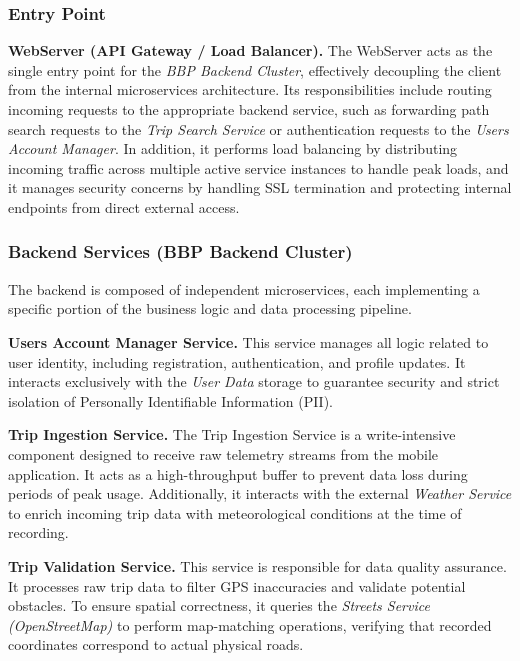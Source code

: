 \subsubsection{Entry Point}

\textbf{WebServer (API Gateway / Load Balancer).}
The WebServer acts as the single entry point for the \textit{BBP Backend Cluster}, effectively decoupling the client from the internal microservices architecture. Its responsibilities include routing incoming requests to the appropriate backend service, such as forwarding path search requests to the \textit{Trip Search Service} or authentication requests to the \textit{Users Account Manager}. In addition, it performs load balancing by distributing incoming traffic across multiple active service instances to handle peak loads, and it manages security concerns by handling SSL termination and protecting internal endpoints from direct external access.

\subsubsection{Backend Services (BBP Backend Cluster)}

The backend is composed of independent microservices, each implementing a specific portion of the business logic and data processing pipeline.

\textbf{Users Account Manager Service.}
This service manages all logic related to user identity, including registration, authentication, and profile updates. It interacts exclusively with the \textit{User Data} storage to guarantee security and strict isolation of Personally Identifiable Information (PII).

\textbf{Trip Ingestion Service.}
The Trip Ingestion Service is a write-intensive component designed to receive raw telemetry streams from the mobile application. It acts as a high-throughput buffer to prevent data loss during periods of peak usage. Additionally, it interacts with the external \textit{Weather Service} to enrich incoming trip data with meteorological conditions at the time of recording.

\textbf{Trip Validation Service.}
This service is responsible for data quality assurance. It processes raw trip data to filter GPS inaccuracies and validate potential obstacles. To ensure spatial correctness, it queries the \textit{Streets Service (OpenStreetMap)} to perform map-matching operations, verifying that recorded coordinates correspond to actual physical roads.

